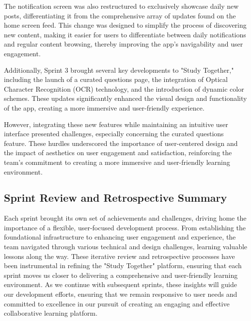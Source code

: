 The notification screen was also restructured to exclusively showcase daily new posts, differentiating it from the comprehensive array of updates found on the home screen feed. This change was designed to simplify the process of discovering new content, making it easier for users to differentiate between daily notifications and regular content browsing, thereby improving the app's navigability and user engagement.

Additionally, Sprint 3 brought several key developments to "Study Together," including the launch of a curated questions page, the integration of Optical Character Recognition (OCR) technology, and the introduction of dynamic color schemes. These updates significantly enhanced the visual design and functionality of the app, creating a more immersive and user-friendly experience.

However, integrating these new features while maintaining an intuitive user interface presented challenges, especially concerning the curated questions feature. These hurdles underscored the importance of user-centered design and the impact of aesthetics on user engagement and satisfaction, reinforcing the team's commitment to creating a more immersive and user-friendly learning environment.

\subsection{Sprint Review and Retrospective Summary}\label{sprint_review_retrospective_summary}
Each sprint brought its own set of achievements and challenges, driving home the importance of a flexible, user-focused development process. From establishing the foundational infrastructure to enhancing user engagement and experience, the team navigated through various technical and design challenges, learning valuable lessons along the way. These iterative review and retrospective processes have been instrumental in refining the "Study Together" platform, ensuring that each sprint moves us closer to delivering a comprehensive and user-friendly learning environment. As we continue with subsequent sprints, these insights will guide our development efforts, ensuring that we remain responsive to user needs and committed to excellence in our pursuit of creating an engaging and effective collaborative learning platform.


